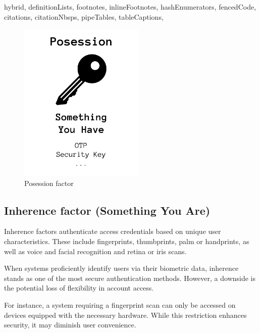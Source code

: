 \documentclass[
  digital,     %
  oneside,     %
  nosansbold,  %
  nocolorbold, %
  lof,         %
  lot,         %
]{fithesis4}
\begin{document}
\begin{markdown*}{%
  hybrid,
  definitionLists,
  footnotes,
  inlineFootnotes,
  hashEnumerators,
  fencedCode,
  citations,
  citationNbsps,
  pipeTables,
  tableCaptions,
}
\begin{figure}[htbp]
  \centering
  \includegraphics[width=0.53\textwidth]{img/posession-final.png}
  \caption{Posession factor}
  \label{fig:posession-factor}
\end{figure}

\newpage
\subsection{Inherence factor (Something You Are)}
Inherence factors authenticate access credentials based on unique user characteristics.
These include fingerprints, thumbprints, palm or handprints, as well as voice and facial recognition and retina or iris scans.

When systems proficiently identify users via their biometric data, inherence stands as one of the most secure authentication methods.
However, a downside is the potential loss of flexibility in account access.

For instance, a system requiring a fingerprint scan can only be accessed on devices equipped with the necessary hardware.
While this restriction enhances security, it may diminish user convenience. \cite{auth-factors-rublon}


\end{markdown*}
\end{document}
